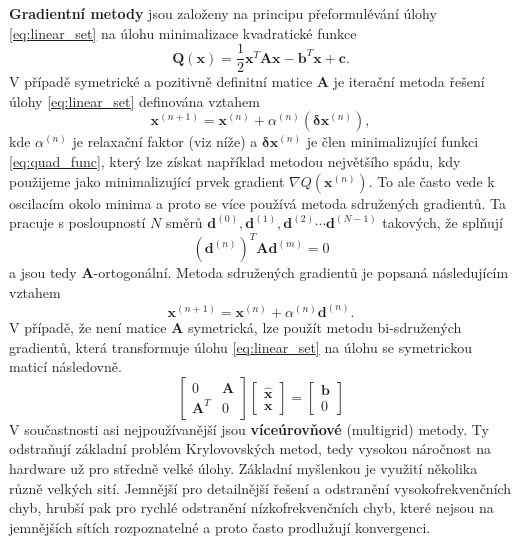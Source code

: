 \documentclass[a4paper,12pt]{report}
\theoremstyle{remark}
\begin{document}
\textbf{Gradientní metody} jsou založeny na principu přeformulévání úlohy \eqref{eq:linear_set} na úlohu  minimalizace kvadratické funkce
\begin{equation}
	\boldsymbol{Q}(\boldsymbol{x}) = \frac{1}{2} \boldsymbol{x}^T \boldsymbol{A} \boldsymbol{x}-\boldsymbol{b}^T \boldsymbol{x} + \boldsymbol{c}.
	\label{eq:quad_func}
\end{equation}
V případě symetrické a pozitivně definitní matice $\boldsymbol{A}$ je iterační metoda řešení úlohy \eqref{eq:linear_set} definována vztahem
\begin{equation}
	\boldsymbol{x}^{(n+1)} = \boldsymbol{x}^{(n)} + \alpha^{(n)} \left( \boldsymbol{\delta} \boldsymbol{x}^{(n)} \right),
	\label{eq:grad_iter}
\end{equation}
kde $\alpha^{(n)}$ je relaxační faktor (viz níže) a $\boldsymbol{\delta} \boldsymbol{x}^{(n)}$ je člen minimalizující funkci \eqref{eq:quad_func}, který lze získat například metodou největšího spádu, kdy použijeme jako minimalizující prvek gradient $\nabla Q(\boldsymbol{x}^{(n)})$. To ale často vede k oscilacím okolo minima a proto se více používá metoda sdružených gradientů. Ta pracuje s posloupností $N$ směrů  $\boldsymbol{d}^{(0)}, \boldsymbol{d}^{(1)}, \boldsymbol{d}^{(2)} \cdots \boldsymbol{d}^{(N-1)}$ takových, že splňují
\begin{equation*}
	\left(\boldsymbol{d}^{(n)}\right)^T\boldsymbol{A} \boldsymbol{d}^{(m)} = 0
\end{equation*}
a jsou tedy $\boldsymbol{A}$-ortogonální. Metoda sdružených gradientů je popsaná následujícím vztahem
\begin{equation*}
	\boldsymbol{x}^{(n+1)} = \boldsymbol{x}^{(n)} + \alpha^{(n)} \boldsymbol{d}^{(n)}.
	\label{eq:grad_cg}
\end{equation*}
V případě, že není matice $\boldsymbol{A}$ symetrická, lze použít metodu bi-sdružených gradientů, která transformuje úlohu \eqref{eq:linear_set} na úlohu se symetrickou maticí následovně.
\begin{equation}
	\begin{bmatrix}
		0 & \boldsymbol{A}\\
		\boldsymbol{A}^T & 0
	\end{bmatrix}
	\begin{bmatrix}
		\hat{\boldsymbol{x}}\\
		\boldsymbol{x}
	\end{bmatrix} =
	\begin{bmatrix}
		\boldsymbol{b}\\
		0
	\end{bmatrix}
\end{equation}
V součastnosti asi nejpoužívanější jsou \textbf{víceúrovňové} (multigrid) metody. Ty odstraňují základní problém Krylovovských metod, tedy vysokou náročnost na hardware už pro středně velké úlohy. Základní myšlenkou je využití několika různě velkých sití. Jemnější pro detailnější řešení a odstranění vysokofrekvenčních chyb, hrubší pak pro rychlé odstranění nízkofrekvenčních chyb, které nejsou na jemnějších sítích rozpoznatelné a proto často prodlužují konvergenci. 
\end{document}
